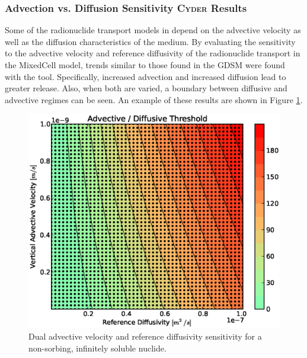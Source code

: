 
\subsubsection{Advection vs. Diffusion Sensitivity \textsc{Cyder} Results}
Some of the  radionuclide transport models in \Cyder depend on the advective velocity as well as the diffusion 
characteristics of the medium. By evaluating the sensitivity to the advective velocity and reference 
diffusivity of the radionuclide transport in the MixedCell model, trends similar to those found in the \gls{GDSM} were found with the \Cyder tool. 
Specifically, increased advection and increased diffusion lead to greater release. Also, when both are varied, a boundary between diffusive and advective
regimes can be seen. An example of these results are shown in Figure 
\ref{fig:dr_adv_diff}.
 
\begin{figure}[ht]
\centering
\includegraphics[width=\linewidth]{./chapters/demonstration/bench/adv_vel_diff.eps}
\caption[Advection vs. Diffusion Sensitivity in \textsc{Cyder}]{Dual advective velocity 
and reference diffusivity sensitivity for a non-sorbing, infinitely soluble 
nuclide.}
\label{fig:dr_adv_diff}
\end{figure}
